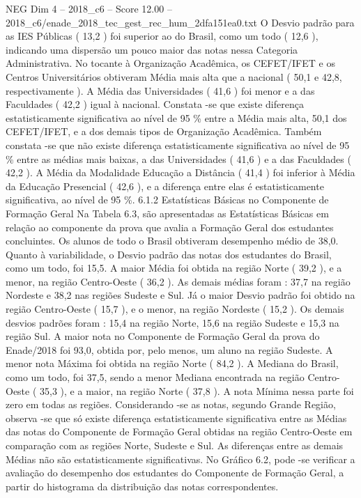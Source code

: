 \begin{textsample}{NEG Dim 4 – 2018\_c6 – Score 12.00 – 2018\_c6/enade\_2018\_tec\_gest\_rec\_hum\_2dfa151ea0.txt}
O Desvio padrão para as IES Públicas ( 13,2 ) foi superior ao do Brasil, como um todo ( 12,6 ), indicando uma dispersão um pouco maior das notas nessa Categoria Administrativa.
No tocante à Organização Acadêmica, os CEFET/IFET e os Centros Universitários obtiveram Média mais alta que a nacional ( 50,1 e 42,8, respectivamente ).
A Média das Universidades ( 41,6 ) foi menor e a das Faculdades ( 42,2 ) igual à nacional.
Constata -se que existe diferença estatisticamente significativa ao nível de 95 \% entre a Média mais alta, 50,1 dos CEFET/IFET, e a dos demais tipos de Organização Acadêmica.
Também constata -se que não existe diferença estatisticamente significativa ao nível de 95 \% entre as médias mais baixas, a das Universidades ( 41,6 ) e a das Faculdades ( 42,2 ).
A Média da Modalidade Educação a Distância ( 41,4 ) foi inferior à Média da Educação Presencial ( 42,6 ), e a diferença entre elas é estatisticamente significativa, ao nível de 95 \%. 6.1.2 Estatísticas Básicas no Componente de Formação Geral Na Tabela 6.3, são apresentadas as Estatísticas Básicas em relação ao componente da prova que avalia a Formação Geral dos estudantes concluintes.
Os alunos de todo o Brasil obtiveram desempenho médio de 38,0.
Quanto à variabilidade, o Desvio padrão das notas dos estudantes do Brasil, como um todo, foi 15,5.
A maior Média foi obtida na região Norte ( 39,2 ), e a menor, na região Centro-Oeste ( 36,2 ).
As demais médias foram : 37,7 na região Nordeste e 38,2 nas regiões Sudeste e Sul.
Já o maior Desvio padrão foi obtido na região Centro-Oeste ( 15,7 ), e o menor, na região Nordeste ( 15,2 ).
Os demais desvios padrões foram : 15,4 na região Norte, 15,6 na região Sudeste e 15,3 na região Sul.
A maior nota no Componente de Formação Geral da prova do Enade/2018 foi 93,0, obtida por, pelo menos, um aluno na região Sudeste.
A menor nota Máxima foi obtida na região Norte ( 84,2 ).
A Mediana do Brasil, como um todo, foi 37,5, sendo a menor Mediana encontrada na região Centro-Oeste ( 35,3 ), e a maior, na região Norte ( 37,8 ).
A nota Mínima nessa parte foi zero em todas as regiões.
Considerando -se as notas, segundo Grande Região, observa -se que só existe diferença estatisticamente significativa entre as Médias das notas do Componente de Formação Geral obtidas na região Centro-Oeste em comparação com as regiões Norte, Sudeste e Sul.
As diferenças entre as demais Médias não são estatisticamente significativas.
No Gráfico 6.2, pode -se verificar a avaliação do desempenho dos estudantes do Componente de Formação Geral, a partir do histograma da distribuição das notas correspondentes.

\end{textsample}
